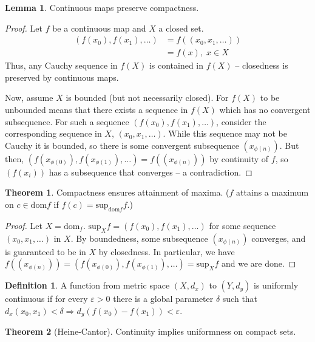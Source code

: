 \documentclass{article}
\theoremstyle{definition}
\newtheorem{thm}{Theorem}[subsubsection]
\newtheorem{defn}{Definition}[subsubsection]
\newtheorem{lem}{Lemma}[subsubsection]
\begin{document}
\begin{lem}
	Continuous maps preserve compactness.
\end{lem}
\begin{proof}
	Let $f$ be a continuous map and $X$ a closed set.
	\begin{align*}
		(f(x_0),f(x_1),\dots)&=f((x_0,x_1,\dots))\tag*{(by continuity of $f$)}\\
		&=f(x),\;x\in X\tag*{(by closedness of $X$)}
	\end{align*}
	Thus, any Cauchy sequence in $f(X)$ is contained in $f(X)$ -- closedness is preserved by continuous maps.\par

	Now, assume $X$ is bounded (but not necessarily closed). For $f(X)$ to be unbounded means that there exists a sequence in $f(X)$ which has no convergent subsequence. For such a sequence $(f(x_0),f(x_1),\dots)$, consider the corresponding sequence in $X$, $(x_0,x_1,\dots)$. While this sequence may not be Cauchy it is bounded, so there is some convergent subsequence $(x_{\phi(n)})$. But then, $(f(x_{\phi(0)}),f(x_{\phi(1)}),\dots)=f((x_{\phi(n)}))$ by continuity of $f$, so $(f(x_i))$ has a subsequence that converges -- a contradiction.
\end{proof}
\begin{thm}
	Compactness ensures attainment of maxima. ($f$ attains a maximum on $c\in\text{dom}f$ if $f(c)=\text{sup}_{\text{dom}f}f$.)
\end{thm}
\begin{proof}
	Let $X=\text{dom}_f$. $\text{sup}_Xf=(f(x_0),f(x_1),\dots)$ for some sequence $(x_0,x_1,\dots)$ in $X$. By boundedness, some subsequence $(x_{\phi(n)})$ converges, and is guaranteed to be in $X$ by closedness. In particular, we have $f((x_{\phi(n)}))=(f(x_{\phi(0)}),f(x_{\phi(1)}),\dots)=\text{sup}_Xf$ and we are done.
\end{proof}
\begin{defn}
	A function from metric space $(X,d_x)$ to $(Y,d_y)$ is uniformly continuous if for every $\varepsilon>0$ there is a global parameter $\delta$ such that $d_x(x_0,x_1)<\delta\Rightarrow d_y(f(x_0)-f(x_1))<\varepsilon$.
\end{defn}
\begin{thm}[Heine-Cantor]
	Continuity implies uniformness on compact sets.
\end{thm}
\end{document}
